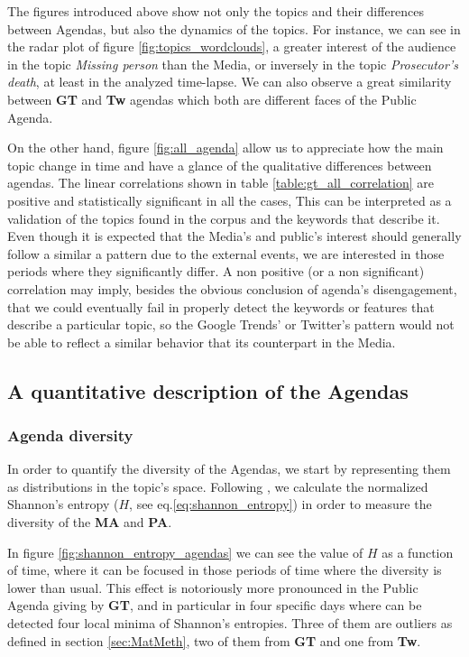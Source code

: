 \documentclass[a4paper, 12pt]{article}
\begin{document}
\par The figures introduced above show not only the topics and their differences between Agendas, but also the dynamics of the topics.  For instance, we can see in the radar plot of figure \ref{fig:topics_wordclouds}, a greater interest of the audience in the topic \emph{Missing person} than the Media, or inversely in the topic \emph{Prosecutor's death}, at least in the analyzed time-lapse. 
We can also observe a great similarity between \textbf{GT} and \textbf{Tw} agendas which both are different faces of the Public Agenda.

\par On the other hand, figure \ref{fig:all_agenda} allow us to appreciate how the main topic change in time and have a glance of the qualitative differences between agendas.
The linear correlations shown in table \ref{table:gt_all_correlation} are  positive and statistically significant in all the cases, This can be interpreted as a validation of the topics found in the corpus and the keywords that describe it. 
Even though it is expected that the Media's and public's interest should generally follow a similar a pattern due to the external events, we are interested in those periods where they significantly differ. 
A non positive (or a non significant) correlation may imply, besides the obvious conclusion of agenda's disengagement, that we could eventually fail in properly detect the keywords or features that describe a particular topic, so the Google Trends' or Twitter's pattern would not be able to reflect a similar behavior that its counterpart in the Media.

\subsection{A quantitative description of the Agendas}

\subsubsection{Agenda diversity}


\par In order to quantify the diversity of the Agendas, we start by representing them as distributions in the topic's space. 
Following \cite{boydstun2014importance}, we calculate the normalized Shannon's entropy ($H$, see eq.\ref{eq:shannon_entropy}) in order to measure the diversity of the \textbf{MA} and \textbf{PA}.
\par In figure \ref{fig:shannon_entropy_agendas} we can see the value of $H$ as a function of time, where it can be focused in those periods of time where the diversity is lower than usual. This effect is notoriously more pronounced in the Public Agenda giving by \textbf{GT}, and in particular in four specific days  where can be detected four local minima of Shannon's entropies. Three of them are outliers as defined in section \ref{sec:MatMeth}, two of them from \textbf{GT} and one from \textbf{Tw}. 
\end{document}
